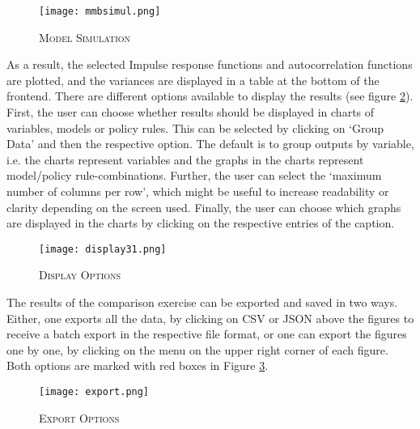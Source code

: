 \begin{figure}[H]
	\centering
	\caption{\textsc{Model Simulation}}
	\vspace{0.2cm}
	\texttt{[image: mmbsimul.png]}\\
	\label{mmbsimul}
\end{figure}

As a result, the selected Impulse response functions and  autocorrelation functions are plotted, and the variances are displayed in a table at the bottom of the frontend. 
There are different options available to display the results (see figure \ref{display}). First, the user can choose whether results should be displayed in charts of variables, models or policy rules. This can be selected by clicking on `Group Data' and then the respective option. The default is to group outputs by variable, i.e. the charts represent variables and the graphs in the charts represent model/policy rule-combinations. 
Further, the user can select the `maximum number of columns per row', which might be useful to increase readability or clarity depending on the screen used. 
Finally, the user can choose which graphs are displayed in the charts by clicking on the respective entries of the caption.

\begin{figure}[H]
	\centering
	\caption{\textsc{Display Options}}
	\vspace{0.2cm}
	\texttt{[image: display31.png]}\\
	\label{display}
\end{figure}


The results of the comparison exercise can be exported and saved in two ways. Either, one exports all the data, by clicking on CSV or JSON above the figures to receive a batch export in the respective file format, or one can export the figures one by one, by clicking on the menu on the upper right corner of each figure. Both options are marked with red boxes in Figure \ref{export}.
\begin{figure}[H]
	\centering
	\caption{\textsc{Export Options}}
	\vspace{0.2cm}
	\texttt{[image: export.png]}\\
	\label{export}
\end{figure}
